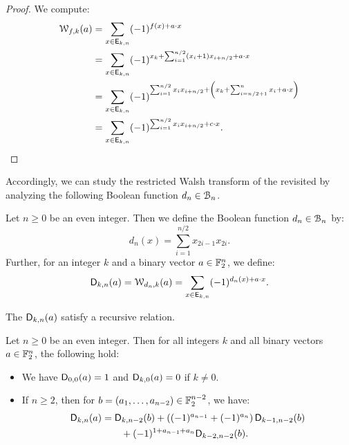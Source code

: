 \documentclass{llncs}
\begin{document}
\begin{proof}
	We compute:
	\begin{align*}
		\wtk{f}{k}(a)&=\sum_{x \in \Ekn{k}{n}} (-1)^{f(x)+a \cdot x}\\
		&=\sum_{x \in \Ekn{k}{n}} (-1)^{x_k + \sum_{i=1}^{n/2} (x_i+1) x_{i+n/2}+ a \cdot x}\\
		&=\sum_{x \in \Ekn{k}{n}} (-1)^{\sum_{i=1}^{n/2} x_i x_{i+n/2}+\left(x_k+\sum_{i=n/2+1}^{n}x_i+a\cdot x\right)}\\
		&=\sum_{x \in \Ekn{k}{n}} (-1)^{\sum_{i=1}^{n/2} x_i x_{i+n/2}+ c \cdot x}.\qedhere
	\end{align*}
\end{proof}

Accordingly, we can study the restricted Walsh transform of the revisited \hwbf{} by analyzing the following Boolean function $d_n\in\BN$.

\begin{definition}
	Let $n\geq 0$ be an even integer. Then we define the Boolean function $d_n\in\BN$ by:
	\[
		d_n(x)=\sum_{i=1}^{n/2}x_{2i-1}x_{2i}.
	\]
	Further, for an integer $k$ and a binary vector $a\in\F_2^n$, we define:
	\[
		\Dnka{n}{k}{a}=\wtk{d_n}{k}(a)=\sum_{x\in \Ekn{k}{n}} (-1)^{d_n(x) +a\cdot x}.
	\]
\end{definition}

The $\Dnka{n}{k}{a}$ satisfy a recursive relation.

\begin{proposition}\label{prop:recursiveDnka}
Let $n\geq 0$ be an even integer. Then for all integers $k$ and all binary vectors $a\in\F_2^n$, the following hold:
	\begin{itemize}
		\item We have $\Dnka 00a=1$ and $\Dnka 0ka=0$ if $k\neq 0$.
		\item If $n\geq 2$, then for $b=(a_1,\dots,a_{n-2})\in\F_2^{n-2}$, we have:
		\begin{align*}
			\Dnka{n}{k}{a}&=\Dnka{n-2}{k}{b}+\left((-1)^{a_{n-1}} + (-1)^{a_{n}}\right)\Dnka{n-2}{k-1}{b}\\
			&\qquad+ (-1)^{1+a_{n-1}+a_n} \Dnka{n-2}{k-2}{b}.
		\end{align*}
	\end{itemize}
\end{proposition}
\end{document}
